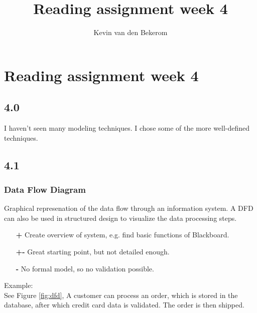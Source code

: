 

\title{Reading assignment week 4}
\newcommand{\TitelAbbr}{}
\newcommand{\Version}{0.1}



\what{}
\supervisors{}
\author{Kevin van den Bekerom}




\maketitle
\clearpage


\chapter*{Reading assignment week 4}

\section*{4.0}
I haven't seen many modeling techniques. I chose some of the more well-defined techniques.

\section*{4.1}

\subsection*{Data Flow Diagram \cite{dfd}}
Graphical represenation of the data flow through an information system. A DFD can also be used in structured design to visualize the data processing steps.
\begin{itemize}
	\item[\textbf{+}] Create overview of system, e.g. find basic functions of Blackboard.
	\item[\textbf{+-}] Great starting point, but not detailed enough.
	\item[\textbf{-}] No formal model, so no validation possible.
\end{itemize}

Example: \\
See Figure \ref{fig:dfd}, A customer can process an order, which is stored in the database, after which credit card data is validated. The order is then shipped. 

